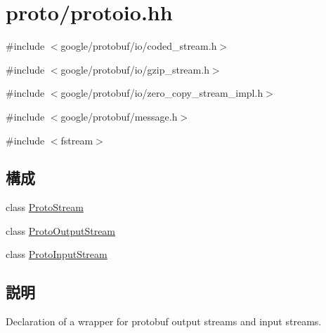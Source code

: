\hypertarget{protoio_8hh}{
\section{proto/protoio.hh}
\label{protoio_8hh}
}
{\ttfamily \#include $<$google/protobuf/io/coded\_\-stream.h$>$}\par
{\ttfamily \#include $<$google/protobuf/io/gzip\_\-stream.h$>$}\par
{\ttfamily \#include $<$google/protobuf/io/zero\_\-copy\_\-stream\_\-impl.h$>$}\par
{\ttfamily \#include $<$google/protobuf/message.h$>$}\par
{\ttfamily \#include $<$fstream$>$}\par
\subsection*{構成}
\begin{DoxyCompactItemize}
\item 
class \hyperlink{classProtoStream}{ProtoStream}
\item 
class \hyperlink{classProtoOutputStream}{ProtoOutputStream}
\item 
class \hyperlink{classProtoInputStream}{ProtoInputStream}
\end{DoxyCompactItemize}


\subsection{説明}
Declaration of a wrapper for protobuf output streams and input streams. 